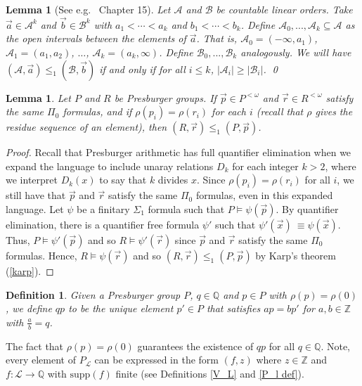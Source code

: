 \documentclass{amsart}%
\numberwithin{theorem}{section}
\newtheorem{definition}[theorem]{Definition}
\newtheorem{lemma}[theorem]{Lemma}
\newcommand{\Q}{\mathbb{Q}}
\newcommand{\Z}{\mathbb{Z}}
\newcommand{\A}{\mathcal{A}}
\newcommand{\B}{\mathcal{B}}
\newcommand{\0}{\emptyset}
\newcommand{\lom}{^{< \omega}}
\newcommand{\LL}{\mathcal{L}}
\newcommand{\supp}{\text{supp}}
\begin{document}
\begin{lemma}[See e.g.\ \cite{AK-book} Chapter 15] 
\label{lemma geq suborderings}
Let $\A$ and $\B$ be countable linear orders. Take $\vec a\in \A^k$ and $\vec b\in \B^k$ with $a_1<\cdots< a_k$ and $b_1<\cdots <b_k$.  Define $\A_0,...,\A_k\subseteq \A$ as the open intervals between the elements of $\vec a$. That is, $\A_0=(-\infty,a_1)$, $\A_1=(a_1,a_2)$, $\dots$, $\A_k=(a_k,\infty)$. Define $\B_0,...,\B_k$ analogously. We will have $(\A,\vec a)\leq_1 (\B,\vec b)$ if and only if for all $i\leq k$, $|\A_i|\geq |\B_i|$. \qed
    
\end{lemma}

\begin{lemma}
\label{same atomic}
    Let $P$ and $R$ be Presburger groups. If $\vec p \in P\lom$ and $\vec r\in R\lom$ satisfy the same $\Pi_0$ formulas, and if $\rho(p_i)=\rho(r_i)$ for each $i$ (recall that $\rho$ gives the residue sequence of an element), then $(R,\vec r)\leq_1 (P,\vec p)$.
\end{lemma}

\begin{proof}
 Recall that Presburger arithmetic has full quantifier elimination when we expand the language to include unaray relations $D_k$ for each integer $k>2$, where we interpret $D_k(x)$ to say that $k$ divides $x$. Since $\rho(p_i)=\rho(r_i)$ for all $i$, we still have that $\vec p$ and $\vec r$ satisfy the same $\Pi_0$ formulas, even in this expanded language. Let $\psi$ be a finitary $\Sigma_1$ formula such that $P\models \psi(\vec p)$. By quantifier elimination, there is a quantifier free formula $\psi'$ such that $\psi'(\vec x)\ \equiv \psi(\vec x)$. Thus, $P\models \psi'(\vec p)$ and so $R\models \psi'(\vec r)$ since $\vec p$ and $\vec r$ satisfy the same $\Pi_0$ formulas. Hence, $R\models \psi(\vec r)$ and so $(R,\vec r) \leq _1 (P,\vec p)$ by Karp's theorem (\ref{karp}). \end{proof}




\begin{definition}
    Given a Presburger group $P$,  $q\in \Q$ and  $p\in P$ with $\rho(p)=\rho(0)$, we define $qp$ to be the unique element $p'\in P$ that satisfies $ap=bp'$ for $a,b\in \Z$ with $\frac{a}{b}=q$. 
\end{definition}
The fact that $\rho(p)=\rho(0)$ guarantees the existence of $qp$ for all $q\in \Q$.  Note, every element of $P_\LL$ can be expressed in the form $(f,z)$ where  $z\in  \Z$ and $f:\LL\to \Q$ with $\supp(f)$ finite (see Definitions \ref{V_L} and \ref{P_l def}). 
\end{document}
